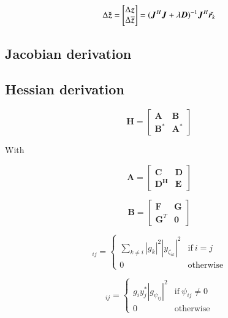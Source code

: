 \documentclass[a4paper,fleqn,usenatbib]{mnras}
\newcommand{\bz}{\bmath{z}}
\newcommand{\br}{\bmath{r}}
\newcommand{\bJ}{\bmath{J}}
\newcommand{\bD}{\bmath{D}}
\newcommand{\conj}[1]{\overline{#1}}
\begin{document}
\begin{equation}
 \Delta \breve{\bz} = \begin{bmatrix}\Delta \bz\\ \Delta \conj{\bz} \end{bmatrix} = (\bJ^H\bJ + \lambda \bD)^{-1}\bJ^H\breve{\br_k}
\end{equation}






\subsection{Jacobian derivation}
\subsection{Hessian derivation}
\begin{equation}
\boldsymbol{H} = 
\begin{bmatrix}
\boldsymbol{A} & \boldsymbol{B}\\
\boldsymbol{B}^* & \boldsymbol{A}^*
\end{bmatrix}
\end{equation}

With 

\begin{equation}
\boldsymbol{A} = 
\begin{bmatrix}
\boldsymbol{C} & \boldsymbol{D}\\
\boldsymbol{D^H} & \boldsymbol{E}
\end{bmatrix}
\end{equation}

\begin{equation}
\boldsymbol{B} = 
\begin{bmatrix}
\boldsymbol{F} & \boldsymbol{G}\\
\boldsymbol{G}^T & \boldsymbol{0}
\end{bmatrix}
\end{equation}

\begin{equation}
[\boldsymbol{C}]_{ij} = 
\begin{cases}
 \sum_{k \neq i} \left | g_k \right |^2 \left | y_{\zeta_{ik}} \right |^2 & \textrm{if} ~ i=j\\
 0 & \textrm{otherwise}
\end{cases}
\end{equation}

\begin{equation}
[\boldsymbol{D}]_{ij} = 
\begin{cases}
 g_i y_j^*  \left | g_{\psi_{ij}} \right |^2  & \textrm{if} ~ \psi_{ij}\neq0\\
 0 & \textrm{otherwise}
\end{cases}
\end{equation}
\end{document}
